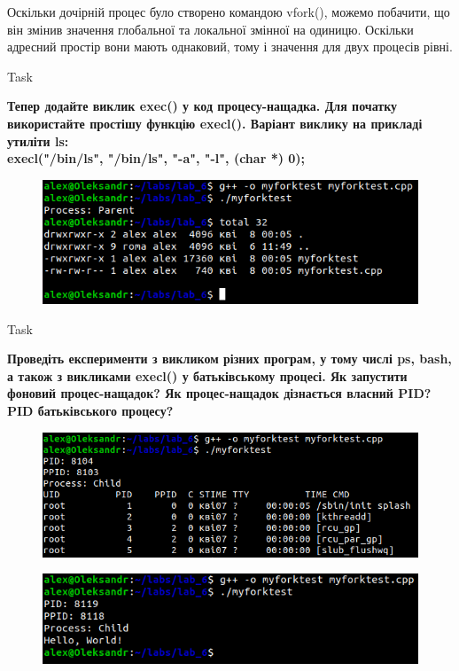 \documentclass[a4paper,12pt]{article}
\newcommand{\RomanNumeralCaps}[1]{\MakeUppercase{\romannumeral #1}}
\begin{document}
    Оскільки дочірній процес було створено командою vfork(), можемо побачити, 
    що він змінив значення глобальної та локальної змінної на одиницю. Оскільки адресний простір вони мають однаковий, тому і значення для двух процесів рівні.

\newpage
    \begin{center}
        \Large{Task \RomanNumeralCaps{7}}
    \end{center}
    \textbf{Тепер додайте виклик exec() у код процесу-нащадка. Для початку використайте простішу функцію execl(). Варіант
    виклику на прикладі утиліти ls: \\
    \textbf{execl("/bin/ls", "/bin/ls", "-a", "-l", (char *) 0);} }
    \begin{figure}[h!]
        \begin{minipage}[h]{1\linewidth}
            \centering
            \includegraphics[width=0.6\linewidth]{Prt sc/Figure_7.png}  
        \end{minipage}
    \end{figure}
    \begin{center}
        \Large{Task \RomanNumeralCaps{8}}
    \end{center}
    \textbf{Проведіть експерименти з викликом різних програм, у тому числі ps, bash, а також з викликами execl() у
    батьківському процесі. Як запустити фоновий процес-нащадок? Як процес-нащадок дізнається власний PID? PID батьківського процесу?}
    \begin{figure}[h!]
        \begin{minipage}[h]{1\linewidth}
            \centering
            \includegraphics[width=0.6\linewidth]{Prt sc/Figure_8_1.png}  
        \end{minipage}
    \end{figure}
    \begin{figure}[h!]
        \begin{minipage}[h]{1\linewidth}
            \centering
            \includegraphics[width=0.6\linewidth]{Prt sc/Figure_8_2.png}  
        \end{minipage}
    \end{figure}
\end{document}
